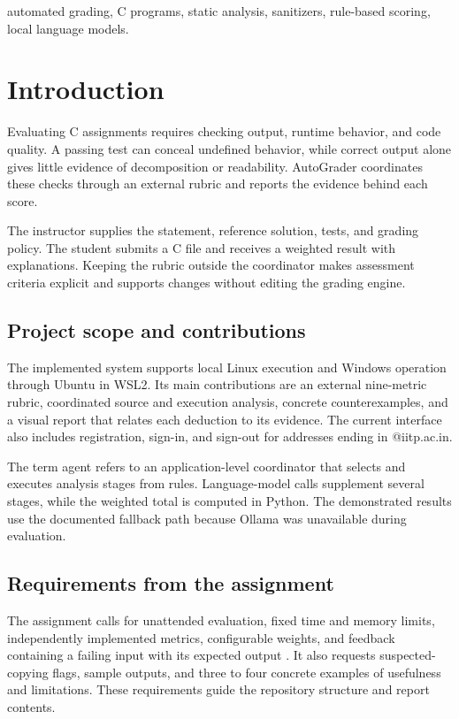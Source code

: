 \documentclass[conference]{IEEEtran}
\begin{document}
\begin{IEEEkeywords}automated grading, C programs, static analysis, sanitizers, rule-based scoring, local language models.\end{IEEEkeywords}

\section{Introduction}

Evaluating C assignments requires checking output, runtime behavior, and code quality. A passing test can conceal undefined behavior, while correct output alone gives little evidence of decomposition or readability. AutoGrader coordinates these checks through an external rubric and reports the evidence behind each score.

The instructor supplies the statement, reference solution, tests, and grading policy. The student submits a C file and receives a weighted result with explanations. Keeping the rubric outside the coordinator makes assessment criteria explicit and supports changes without editing the grading engine.

\newpage

\subsection{Project scope and contributions}

The implemented system supports local Linux execution and Windows operation through Ubuntu in WSL2. Its main contributions are an external nine-metric rubric, coordinated source and execution analysis, concrete counterexamples, and a visual report that relates each deduction to its evidence. The current interface also includes registration, sign-in, and sign-out for addresses ending in @iitp.ac.in.


The term agent refers to an application-level coordinator that selects and executes analysis stages from rules. Language-model calls supplement several stages, while the weighted total is computed in Python. The demonstrated results use the documented fallback path because Ollama was unavailable during evaluation.


\subsection{Requirements from the assignment}

The assignment calls for unattended evaluation, fixed time and memory limits, independently implemented metrics, configurable weights, and feedback containing a failing input with its expected output \cite{ref1}. It also requests suspected-copying flags, sample outputs, and three to four concrete examples of usefulness and limitations. These requirements guide the repository structure and report contents.
\end{document}
